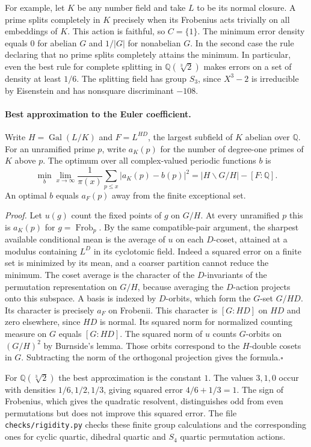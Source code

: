 For example, let $K$ be any number field and take $L$ to be its normal closure.
A prime splits completely in $K$ precisely when its Frobenius acts trivially
on all embeddings of $K$. This action is faithful, so $C=\{1\}$. The minimum
error density equals $0$ for abelian $G$ and $1/|G|$ for nonabelian $G$.
In the second case the rule declaring that no prime splits completely attains
the minimum. In particular, even the best rule for complete splitting in
$\mathbb Q(\sqrt[3]{2})$ makes errors on a set of density at least $1/6$.
The splitting field has group $S_3$, since $X^3-2$ is irreducible by Eisenstein
and has nonsquare discriminant $-108$.

\paragraph{Best approximation to the Euler coefficient.}
Write $H=\operatorname{Gal}(L/K)$ and $F=L^{HD}$, the largest subfield of $K$
abelian over $\mathbb Q$. For an unramified prime $p$, write $a_K(p)$ for the
number of degree-one primes of $K$ above $p$. The optimum over all
complex-valued periodic functions $b$ is
\[
 \boxed{\displaystyle
 \min_b\lim_{x\to\infty}\frac{1}{\pi(x)}\sum_{p\le x}
          |a_K(p)-b(p)|^2
      = |H\backslash G/H|-[F:\mathbb Q].}
\]
An optimal $b$ equals $a_F(p)$ away from the finite exceptional set.

\emph{Proof.} Let $u(g)$ count the fixed points of $g$ on $G/H$. At every
unramified $p$ this is $a_K(p)$ for $g=\operatorname{Frob}_p$. By the
same compatible-pair argument, the sharpest available conditional mean
is the average of $u$ on each $D$-coset, attained at a modulus containing
$L^D$ in its cyclotomic field. Indeed a squared error on a finite set is
minimized by its mean, and a coarser partition cannot reduce the minimum.
The coset average is the character of the $D$-invariants of the permutation
representation on $G/H$, because averaging the $D$-action projects onto
this subspace. A basis is indexed by $D$-orbits, which form the
$G$-set $G/HD$. Its character is precisely $a_F$ on Frobenii. This
character is $[G:HD]$ on $HD$ and zero elsewhere, since $HD$ is normal.
Its squared norm for normalized counting measure on $G$ equals $[G:HD]$.
The squared norm of $u$ counts $G$-orbits on $(G/H)^2$ by Burnside's lemma.
Those orbits correspond to the $H$-double cosets in $G$. Subtracting
the norm of the orthogonal projection gives the formula.\hfill$\square$

For $\mathbb Q(\sqrt[3]{2})$ the best approximation is the constant $1$.
The values $3,1,0$ occur with densities $1/6,1/2,1/3$, giving squared
error $4/6+1/3=1$. The sign of Frobenius, which gives the quadratic
resolvent, distinguishes odd from even permutations but does not improve
this squared error. The file \texttt{checks/rigidity.py} checks these
finite group calculations and the corresponding ones for cyclic quartic,
dihedral quartic and $S_4$ quartic permutation actions.

